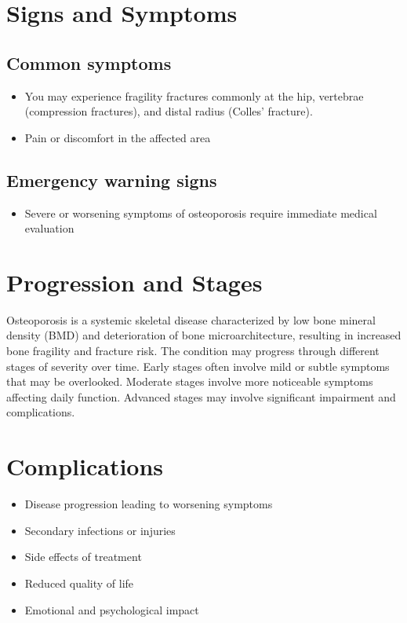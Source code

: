 \section{Signs and Symptoms}

\subsection{Common symptoms}
\begin{itemize}[noitemsep]
  \item You may experience fragility fractures commonly at the hip, vertebrae (compression fractures), and distal radius (Colles' fracture).
  \item Pain or discomfort in the affected area
  \end{itemize}

\subsection{Emergency warning signs}
\begin{itemize}[noitemsep]
  \item Severe or worsening symptoms of osteoporosis require immediate medical evaluation
\end{itemize}
\section{Progression and Stages}
Osteoporosis is a systemic skeletal disease characterized by low bone mineral density (BMD) and deterioration of bone microarchitecture, resulting in increased bone fragility and fracture risk. The condition may progress through different stages of severity over time. Early stages often involve mild or subtle symptoms that may be overlooked. Moderate stages involve more noticeable symptoms affecting daily function. Advanced stages may involve significant impairment and complications.
\section{Complications}
\begin{itemize}[noitemsep]
  \item Disease progression leading to worsening symptoms
  \item Secondary infections or injuries
  \item Side effects of treatment
  \item Reduced quality of life
  \item Emotional and psychological impact
\end{itemize}
